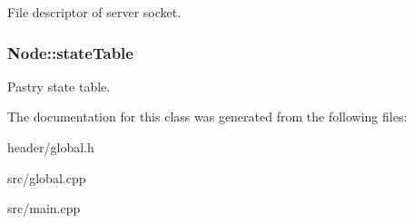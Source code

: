 File descriptor of server socket. \hypertarget{classNode_a22dbe41a765f7d31f43f5996d2aedb91}{
\subsubsection[{state\-Table}]{ Node\-::state\-Table}}\label{classNode_a22dbe41a765f7d31f43f5996d2aedb91}
Pastry state table. 

The documentation for this class was generated from the following files\-:\begin{DoxyCompactItemize}
\item 
header/global.\-h\item 
src/global.\-cpp\item 
src/main.\-cpp\end{DoxyCompactItemize}

